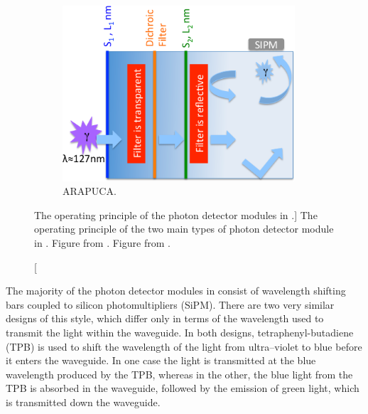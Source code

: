 \begin{figure}
\begin{subfigure}[b]{0.69\textwidth}
		\includegraphics[width=0.95\textwidth]{figures/pdsp_arapuca.png}
		\caption{ARAPUCA.}
		\label{fig:arapuca}
	\end{subfigure}

	\caption
	[The operating principle of the photon detector modules in \protodune{}.]
	{The operating principle of the two main types of photon detector module in 
	\protodune{}. Figure  from \cite{Abi:2017aow}. Figure 
	 from \cite{Machado:2016jqe}.}

	\label{fig:pdsp_pd}

\end{figure}

The majority of the photon detector modules in \protodune{} consist of 
wavelength shifting bars coupled to silicon photomultipliers (SiPM). There are 
two very similar designs of this style, which differ only in terms of the 
wavelength used to transmit the light within the waveguide. In both designs, 
tetraphenyl-butadiene (TPB) is used to shift the wavelength of the light from 
ultra--violet to blue before it enters the waveguide. In one case the 
light is transmitted at the blue wavelength produced by the TPB, whereas 
in the other, the blue light from the TPB is absorbed in the waveguide, followed
by the emission of green light, which is transmitted down the waveguide.


